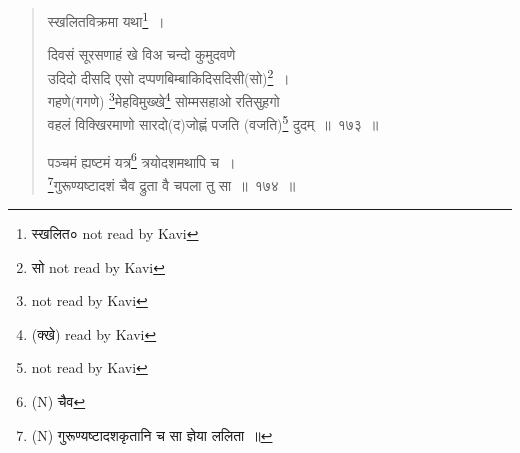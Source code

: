 \documentclass[11pt, openany]{book}
\begin{document}
\begin{quote}
स्खलितविक्रमा यथा\renewcommand{\thefootnote}{9}\footnote{स्खलित० not read by Kavi}~।

{\na दिवसं सूरसणाहं खे विअ चन्दो कुमुदवणे \\
उदिदो दीसदि एसो दप्पणबिम्बाकिदिसदिसी(सो)\renewcommand{\thefootnote}{10}\footnote{सो not read by Kavi}~।\\
गहणे(गगणे) \renewcommand{\thefootnote}{11}\footnote{not read by Kavi}मेहविमुख्खे\renewcommand{\thefootnote}{12}\footnote{(क्खे) read by Kavi} सोम्मसहाओ रतिसुहगो\\
वहलं विक्खिरमाणो सारदो(द)जोह्णं पजति (वजति)\renewcommand{\thefootnote}{13}\footnote{not read by Kavi} दुदम्~॥~१७३~॥}

{ }

{\na पञ्चमं ह्यष्टमं यत्र\renewcommand{\thefootnote}{14}\footnote{(N) चैव} त्रयोदशमथापि च~।\\
\renewcommand{\thefootnote}{15}\footnote{(N) गुरूण्यष्टादशकृतानि च सा ज्ञेया ललिता~॥}गुरूण्यष्टादशं चैव द्रुता वै चपला तु सा~॥~१७४~॥}
\end{quote}

\newpage
\end{document}
